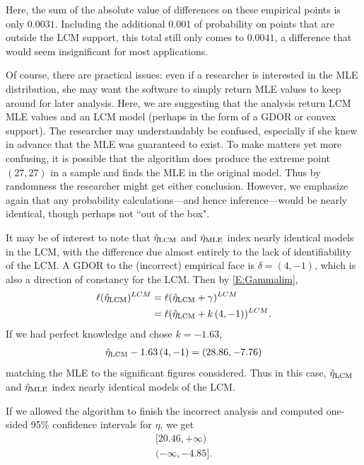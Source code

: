 Here, the sum of the absolute value of differences on these empirical points is only 
$0.0031$.  Including the additional 0.001 of probability on points that are outside 
the LCM support, this total still only comes to $0.0041$, a difference that would seem 
insignificant for most applications.  

Of course, there are practical issues: even if a researcher is interested in the 
MLE distribution, she may want the software to simply 
return MLE values to keep around for later analysis.  Here, we are suggesting that the 
analysis return LCM MLE values and an LCM model (perhaps in the form of a GDOR or
convex support).  The researcher may understandably be confused, especially if she knew in 
advance that the MLE was guaranteed to exist.  
To make matters yet more confusing, it is possible that the
algorithm does produce the extreme point $(27,27)$ in a sample and finds the MLE
in the original model.  Thus by randomness the researcher might get either conclusion.
However, we emphasize again that
any probability calculations---and hence inference---would be nearly identical, though perhaps not ``out of the box".

It may be of interest to note that $\hat{\eta}_{\textrm{LCM}}$ and $\hat{\eta}_{\textrm{MLE}}$ index nearly identical 
models in the LCM, with the difference due almost entirely to the lack of 
identifiability of the LCM.  A GDOR to the (incorrect) empirical face is 
$\delta = (4,-1)$, which is also a direction of constancy for the LCM. 
Then by \eqref{E:Gammalim}, 
\begin{align*}
	\ell(\hat{\eta}_{\textrm{LCM}})^{LCM} &= \ell( \hat{\eta}_{\textrm{LCM}} + \gamma )^{LCM}\\
				 &= 	\ell(\hat{\eta}_{\textrm{LCM}} + k \, (4,-1))^{LCM}.
\end{align*}
If we had perfect knowledge and chose $k = -1.63$,
\begin{align*}
	\hat{\eta}_{\textrm{LCM}}  -1.63 \, (4,-1)= (28.86, -7.76) 
\end{align*}
matching the MLE to the significant figures considered.  Thus in this case, $\hat{\eta}_{\textrm{LCM}}$ 
and $\hat{\eta}_{\textrm{MLE}}$ index nearly identical models of the LCM.

If we allowed the algorithm to finish the incorrect analysis and computed 
one-sided 95\% confidence intervals for $\eta$, we get 
\begin{align*}
	[20.46, +\infty)\\
	(-\infty, -4.85].
\end{align*}

